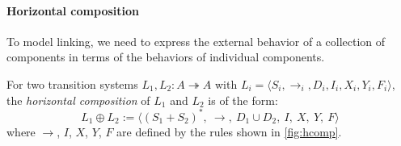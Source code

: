 \documentclass[sigplan,screen,review]{acmart}
\newcommand{\que}{\circ}
\newcommand{\ans}{\bullet}
\newenvironment{optional}{}{}
\begin{document}


\paragraph{Horizontal composition} \label{sec:sem:linker} %

To model linking,
we need to express the external behavior
of a collection of components
in terms of the behaviors of
individual components.

\begin{definition} \label{def:hcomp} %
For two transition systems $L_1, L_2 : A \twoheadrightarrow A$
with
$L_i = \langle S_i, {\rightarrow}_i, D_i, I_i, X_i, Y_i, F_i \rangle$,
the \emph{horizontal composition} of $L_1$ and $L_2$
is of the form:
\[
    L_1 \oplus L_2 :=
    \big\langle
      (S_1 + S_2)^*, \: {\rightarrow}, \:
      D_1 \cup D_2, \:
      I, \: X, \: Y, \: F
    \big\rangle
\]
where %
$\rightarrow$, $I$, $X$, $Y$, $F$
are defined by
the rules shown in \autoref{fig:hcomp}.
\end{definition}
\end{document}
